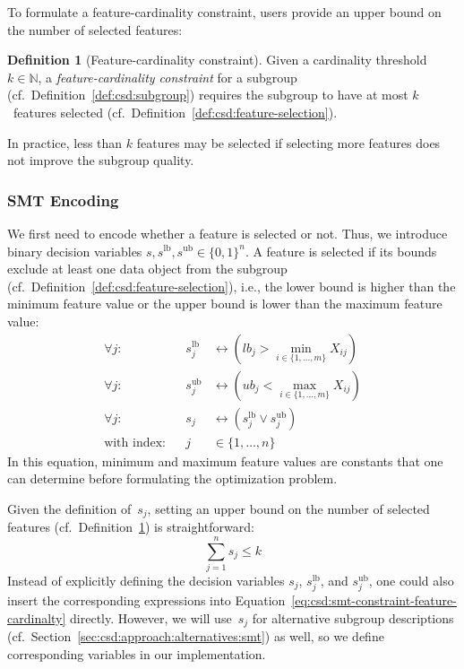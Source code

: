 \documentclass{article}
\theoremstyle{definition}
\newtheorem{definition}{Definition}
\begin{document}
To formulate a feature-cardinality constraint, users provide an upper bound on the number of selected features:
%
\begin{definition}[Feature-cardinality constraint]
	Given a cardinality threshold $k \in \mathbb{N}$,
	a \emph{feature-cardinality constraint} for a subgroup (cf.~Definition~\ref{def:csd:subgroup}) requires the subgroup to have at most $k$~features selected (cf.~Definition~\ref{def:csd:feature-selection}).
	\label{def:csd:feature-cardinality-constraint}
\end{definition}
%
In practice, less than $k$ features may be selected if selecting more features does not improve the subgroup quality.

\subsubsection{SMT Encoding}
\label{sec:csd:approach:cardinality:smt}

We first need to encode whether a feature is selected or not.
Thus, we introduce binary decision variables $s, s^{\text{lb}}, s^{\text{ub}} \in \{0, 1\}^n$.
A feature is selected if its bounds exclude at least one data object from the subgroup (cf.~Definition~\ref{def:csd:feature-selection}), i.e., the lower bound is higher than the minimum feature value or the upper bound is lower than the maximum feature value:
%
\begin{equation}
	\begin{aligned}
		\forall j: & & s^{\text{lb}}_j &\leftrightarrow \left( \mathit{lb}_j > \min_{i \in \{1, \dots, m\}} X_{ij} \right) \\
		\forall j: & &s^{\text{ub}}_j &\leftrightarrow \left( \mathit{ub}_j < \max_{i \in \{1, \dots, m\}} X_{ij} \right) \\
		\forall j: & & s_j &\leftrightarrow \left( s^{\text{lb}}_j \lor s^{\text{ub}}_j \right) \\
		\text{with index:} & & j &\in \{1, \dots, n\}
	\end{aligned}
	\label{eq:csd:smt-constraint-feature-selection}
\end{equation}
%
In this equation, minimum and maximum feature values are constants that one can determine before formulating the optimization problem.

Given the definition of~$s_j$, setting an upper bound on the number of selected features (cf.~Definition~\ref{def:csd:feature-cardinality-constraint}) is straightforward:
%
\begin{equation}
	\sum_{j=1}^n s_j \leq k
	\label{eq:csd:smt-constraint-feature-cardinalty}
\end{equation}
%
Instead of explicitly defining the decision variables $s_j$, $s^{\text{lb}}_j$, and $s^{\text{ub}}_j$, one could also insert the corresponding expressions into Equation~\ref{eq:csd:smt-constraint-feature-cardinalty} directly.
However, we will use~$s_j$ for alternative subgroup descriptions (cf.~Section~\ref{sec:csd:approach:alternatives:smt}) as well, so we define corresponding variables in our implementation.
\end{document}
